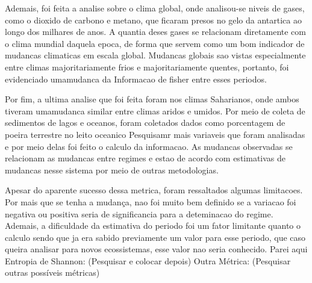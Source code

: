 \documentclass{article}[12pt]
\begin{document}
Ademais, foi feita a analise sobre o clima global, onde analisou-se niveis de gases, como o dioxido de carbono e metano, que ficaram presos no gelo da antartica ao longo dos milhares de anos. A quantia deses gases se relacionam diretamente com o clima mundial daquela epoca, de forma que servem como um bom indicador de mudancas climaticas em escala global. Mudancas globais sao vistas especialmente entre climas majoritariamente frios e majoritariamente quentes, portanto, foi evidenciado umamudanca da Informacao de fisher entre esses periodos. \par

Por fim, a ultima analise que foi feita foram nos climas Saharianos, onde ambos tiveram umamudanca similar entre climas aridos e umidos. Por meio de coleta de sedimentos de lagos e oceanos, foram coletados dados como porcentagem de poeira terrestre no leito oceanico {\color{cyan} Pesquisamr mais variaveis que foram analisadas} e por meio delas foi feito o calculo da informacao. As mudancas observadas se relacionam as mudancas entre regimes e estao de acordo com estimativas de mudancas nesse sistema por meio de outras metodologias.\par

Apesar do aparente sucesso dessa metrica, foram ressaltados algumas limitacoes. Por mais que se tenha a mudança, nao foi muito bem definido se a variacao foi negativa ou positiva seria de significancia para a deteminacao do regime. Ademais, a dificuldade da estimativa do periodo foi um fator limitante quanto o calculo sendo que ja era sabido previamente um valor para esse periodo, que caso queira analisar para novos ecossistemas, esse valor nao seria conhecido.
{\color{cyan} Parei aqui} \\

Entropia de Shannon:
(Pesquisar e colocar depois)
Outra Métrica:
(Pesquisar outras possíveis métricas)
\end{document}

